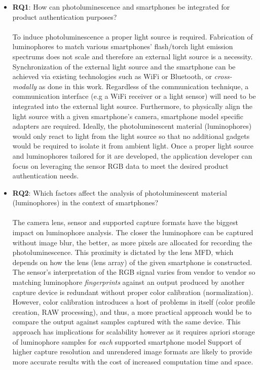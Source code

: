 \documentclass[thesis.tex]{subfiles}
\begin{document}
\begin{itemize}[label=, leftmargin=*]
  \item \textbf{RQ1}: How can photoluminescence and smartphones be integrated for product authentication purposes?\\\\
  To induce photoluminescence a proper light source is required. Fabrication of luminophores to match various smartphones' flash/torch light emission spectrums does not scale and therefore an external light source is a necessity. Synchronization of the external light source and the smartphone can be achieved via existing technologies such as WiFi or Bluetooth, or \emph{cross-modally} as done in this work. Regardless of the communication technique, a communication interface (e.g a WiFi receiver or a light sensor) will need to be integrated into the external light source. Furthermore, to physically align the light source with a given smartphone's camera, smartphone model specific adapters are required. Ideally, the photoluminescent material (luminophores) would only react to light from the light source so that no additional gadgets would be required to isolate it from ambient light. Once a proper light source and luminophores tailored for it are developed, the application developer can focus on leveraging the sensor RGB data to meet the desired product authentication needs.

  \item \textbf{RQ2}: Which factors affect the analysis of photoluminescent material (luminophores) in the context of smartphones?\\\\
  The camera lens, sensor and supported capture formats have the biggest impact on luminophore analysis. The closer the luminophore can be captured without image blur, the better, as more pixels are allocated for recording the photoluminescence. This proximity is dictated by the lens MFD, which depends on how the lens (lens array) of the given smartphone is constructed. The sensor's interpretation of the RGB signal varies from vendor to vendor so matching luminophore \emph{fingerprints} against an output produced by another capture device is redundant without proper color calibration (normalization). However, color calibration introduces a host of problems in itself (color profile creation, RAW processing), and thus, a more practical approach would be to compare the output against samples captured with the same device. This approach has implications for scalability however as it requires apriori storage of luminophore samples for \emph{each} supported smartphone model Support of higher capture resolution and unrendered image formats are likely to provide more accurate results with the cost of increased computation time and space.


\end{itemize}
\end{document}

